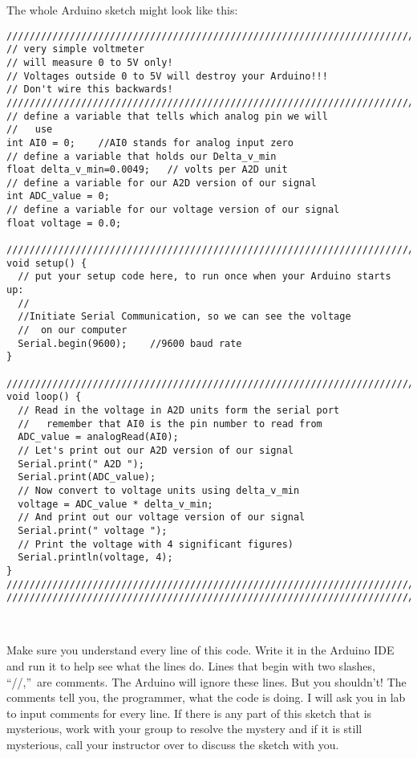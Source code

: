 The whole Arduino sketch might look like this:
\begin{verbatim}
////////////////////////////////////////////////////////////////////////////
// very simple voltmeter
// will measure 0 to 5V only!
// Voltages outside 0 to 5V will destroy your Arduino!!!
// Don't wire this backwards!
////////////////////////////////////////////////////////////////////////////
// define a variable that tells which analog pin we will 
//   use
int AI0 = 0;    //AI0 stands for analog input zero
// define a variable that holds our Delta_v_min
float delta_v_min=0.0049;   // volts per A2D unit
// define a variable for our A2D version of our signal
int ADC_value = 0;
// define a variable for our voltage version of our signal
float voltage = 0.0;
 
////////////////////////////////////////////////////////////////////////////
void setup() {
  // put your setup code here, to run once when your Arduino starts up:
  //
  //Initiate Serial Communication, so we can see the voltage
  //  on our computer
  Serial.begin(9600);    //9600 baud rate
}
 
////////////////////////////////////////////////////////////////////////////
void loop() {
  // Read in the voltage in A2D units form the serial port
  //   remember that AI0 is the pin number to read from
  ADC_value = analogRead(AI0); 
  // Let's print out our A2D version of our signal
  Serial.print(" A2D ");
  Serial.print(ADC_value); 
  // Now convert to voltage units using delta_v_min
  voltage = ADC_value * delta_v_min;
  // And print out our voltage version of our signal
  Serial.print(" voltage ");
  // Print the voltage with 4 significant figures)
  Serial.println(voltage, 4);  
}
////////////////////////////////////////////////////////////////////////////
////////////////////////////////////////////////////////////////////////////
\end{verbatim}

\ 

Make sure you understand every line of this code. Write it in the Arduino
IDE and run it to help see what the lines do. Lines that begin with two
slashes, \textquotedblleft //,\textquotedblright\ are comments. The Arduino
will ignore these lines. But you shouldn't! The comments tell you, the
programmer, what the code is doing. I will ask you in lab to input comments
for every line. If there is any part of this sketch that is mysterious, work
with your group to resolve the mystery and if it is still mysterious, call
your instructor over to discuss the sketch with you.

